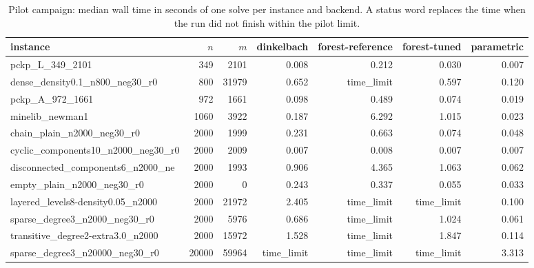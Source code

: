 \begin{table}[tbp]
\centering
\caption{Pilot campaign: median wall time in seconds of one solve per instance and backend. A status word replaces the time when the run did not finish within the pilot limit.}
\label{tab:pilot}
\small
\begin{adjustbox}{max width=\textwidth}
\begin{tabular}{lrrrrrr}
\toprule
instance & $n$ & $m$ & dinkelbach & forest-reference & forest-tuned & parametric \\
\midrule
pckp\_L\_349\_2101 & 349 & 2101 & 0.008 & 0.212 & 0.030 & 0.007 \\
dense\_density0.1\_n800\_neg30\_r0 & 800 & 31979 & 0.652 & time\_limit & 0.597 & 0.120 \\
pckp\_A\_972\_1661 & 972 & 1661 & 0.098 & 0.489 & 0.074 & 0.019 \\
minelib\_newman1 & 1060 & 3922 & 0.187 & 6.292 & 1.015 & 0.023 \\
chain\_plain\_n2000\_neg30\_r0 & 2000 & 1999 & 0.231 & 0.663 & 0.074 & 0.048 \\
cyclic\_components10\_n2000\_neg30\_r0 & 2000 & 2009 & 0.007 & 0.008 & 0.007 & 0.007 \\
disconnected\_components6\_n2000\_ne~ & 2000 & 1993 & 0.906 & 4.365 & 1.063 & 0.062 \\
empty\_plain\_n2000\_neg30\_r0 & 2000 & 0 & 0.243 & 0.337 & 0.055 & 0.033 \\
layered\_levels8-density0.05\_n2000~ & 2000 & 21972 & 2.405 & time\_limit & time\_limit & 0.100 \\
sparse\_degree3\_n2000\_neg30\_r0 & 2000 & 5976 & 0.686 & time\_limit & 1.024 & 0.061 \\
transitive\_degree2-extra3.0\_n2000~ & 2000 & 15972 & 1.528 & time\_limit & 1.847 & 0.114 \\
sparse\_degree3\_n20000\_neg30\_r0 & 20000 & 59964 & time\_limit & time\_limit & time\_limit & 3.313 \\
\bottomrule
\end{tabular}
\end{adjustbox}
\end{table}
